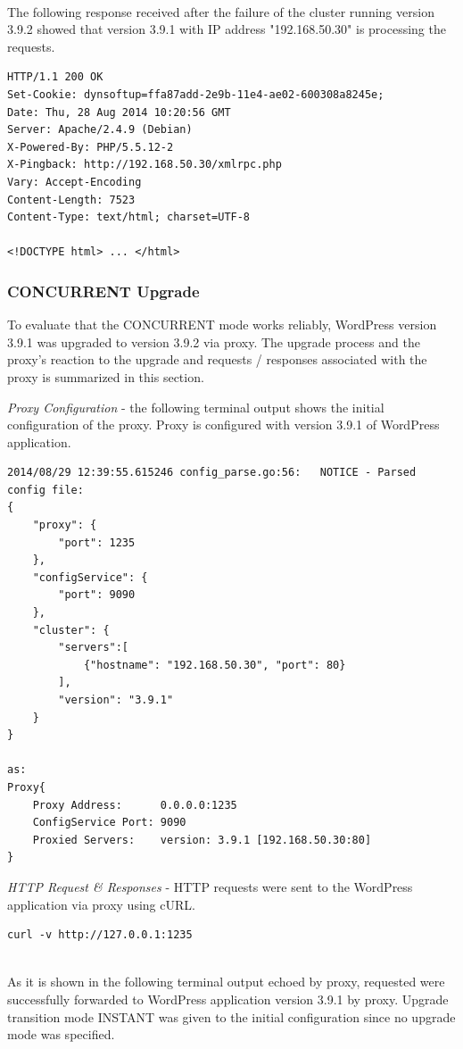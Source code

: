 \documentclass[a4paper,11pt,twoside]{report}
\begin{document}
\noindent\\
The following response received after the failure of the cluster running version 3.9.2 showed that version 3.9.1 with IP address "192.168.50.30" is processing the requests.\smallskip

\begin{lstlisting}[language=terminal]
HTTP/1.1 200 OK
Set-Cookie: dynsoftup=ffa87add-2e9b-11e4-ae02-600308a8245e;
Date: Thu, 28 Aug 2014 10:20:56 GMT
Server: Apache/2.4.9 (Debian)
X-Powered-By: PHP/5.5.12-2
X-Pingback: http://192.168.50.30/xmlrpc.php
Vary: Accept-Encoding
Content-Length: 7523
Content-Type: text/html; charset=UTF-8
 
<!DOCTYPE html> ... </html>
\end{lstlisting}     

\subsubsection*{CONCURRENT Upgrade}
To evaluate that the CONCURRENT mode works reliably, WordPress version 3.9.1 was upgraded to version 3.9.2 via proxy. The upgrade process and the proxy's reaction to the upgrade and requests / responses associated with the proxy is summarized in this section.

\noindent
\textit{Proxy Configuration} - the following terminal output shows the initial configuration of the proxy. Proxy is configured with version 3.9.1 of WordPress application.\smallskip
\begin{lstlisting}[language=terminal]
2014/08/29 12:39:55.615246 config_parse.go:56:   NOTICE - Parsed config file:
{
    "proxy": {
        "port": 1235
    },
    "configService": {
        "port": 9090
    },
    "cluster": {
        "servers":[
            {"hostname": "192.168.50.30", "port": 80}
        ],
        "version": "3.9.1"
    }
}

as:
Proxy{
    Proxy Address:      0.0.0.0:1235
    ConfigService Port: 9090
    Proxied Servers:    version: 3.9.1 [192.168.50.30:80]
}
\end{lstlisting}  

\noindent
\textit{HTTP Request \& Responses} - HTTP requests were sent to the WordPress application via proxy using cURL.
\begin{lstlisting}[language=terminal]
curl -v http://127.0.0.1:1235
\end{lstlisting}  

\noindent\\
As it is shown in the following terminal output echoed by proxy, requested were successfully forwarded to WordPress application version 3.9.1 by proxy. Upgrade transition mode INSTANT was given to the initial configuration since no upgrade mode was specified.
\end{document}
